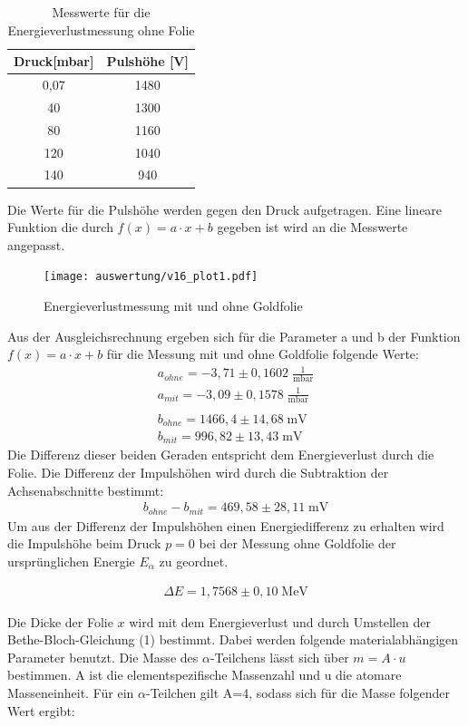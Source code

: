 \begin{table}[H] 
	\centering
	\begin{tabular}{c|c}

	Druck[mbar] & Pulshöhe  [V] \\ 
		\hline 
0,07	& 1480\\
40	& 1300\\
80	& 1160\\
120	& 1040\\
140	& 940\\
	
	\end{tabular} 
	\caption{Messwerte für die Energieverlustmessung ohne Folie } 
	\label{tab:ohne}
\end{table} 

Die Werte für die Pulshöhe werden gegen den Druck aufgetragen. Eine lineare Funktion die durch $f(x)=a\cdot x+b$ gegeben ist wird an die Messwerte angepasst.
\begin{figure}[h]
	\centering
	\texttt{[image: auswertung/v16\_plot1.pdf]}
	\caption{Energieverlustmessung mit und ohne Goldfolie}
	\label{img:grafik-dummy}
\end{figure}
\newpage 
Aus der Ausgleichsrechnung ergeben sich für die Parameter a und b der Funktion $f(x)=a\cdot x+b$ für die Messung mit und ohne Goldfolie folgende Werte: 
\begin{align*}
a_{ohne}= -3,71 \pm 0,1602 \; \frac{1}{\text{mbar}}
\\
a_{mit}= -3,09 \pm 0,1578 \; \frac{1}{\text{mbar}}
\\
\\
b_{ohne}= 1466,4 \pm 14,68 \; \text{mV}
\\
b_{mit}= 996,82 \pm  13,43 \; \text{mV}
\end{align*}
Die Differenz dieser beiden Geraden entspricht dem Energieverlust durch die Folie. Die Differenz der Impulshöhen wird durch die Subtraktion der Achsenabschnitte bestimmt: 
\begin{align}
b_{ohne}-b_{mit}= 469,58 \pm 28,11 \; \text{mV}
\end{align} 
Um aus der Differenz der Impulshöhen einen Energiedifferenz zu erhalten wird die Impulshöhe beim Druck $p=0$ bei der Messung ohne Goldfolie der ursprünglichen Energie $E_\alpha$ zu geordnet. 

\begin{align*}
\Delta E= 1,7568 \pm 0,10\;  \text{MeV}  
\end{align*} 

Die Dicke der Folie $x$ wird mit dem Energieverlust und durch Umstellen der Bethe-Bloch-Gleichung (1) bestimmt. Dabei werden folgende materialabhängigen Parameter benutzt. Die Masse des $\alpha$-Teilchens lässt sich über $m=A \cdot u$ bestimmen. A ist die elementspezifische Massenzahl und u die atomare Masseneinheit. Für ein $\alpha$-Teilchen gilt A=4, sodass sich für die Masse folgender Wert ergibt: 

